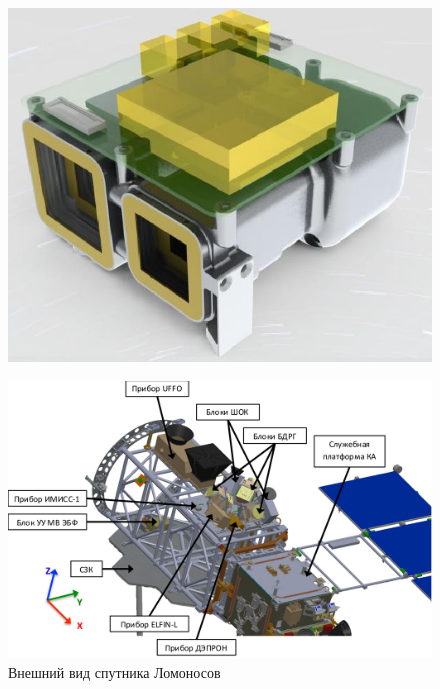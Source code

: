\begin{figure}

\includegraphics[width=0.7\linewidth]{images/EPD_Brochure}
\caption{}
\label{fig:epdbrochure}
\end{figure}


\begin{figure}
\centering
\includegraphics[width=0.9\linewidth]{images/lomo3}
\caption{Внешний вид спутника Ломоносов}
\label{fig:lomo3}
\end{figure}


